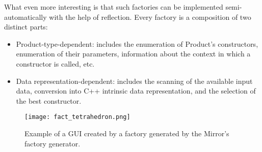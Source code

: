 What even more interesting is that such factories can be
implemented semi-automatically with the help of reflection.
Every factory is a composition of two distinct parts:

\begin{itemize}
\item{Product-type-dependent}: includes the enumeration of Product's
constructors, enumeration of their parameters, information about
the context in which a constructor is called, etc.

\item{Data representation-dependent}: includes the scanning of the
available input data, conversion into C++ intrinsic data representation,
and the selection of the best constructor.
\end{itemize}

\begin{figure}[!th]
\centering
\texttt{[image: fact\_tetrahedron.png]}
\caption{Example of a GUI created by a factory generated by
the Mirror's factory generator.}
\label{fig:fact_tetrahedron}
\end{figure}

